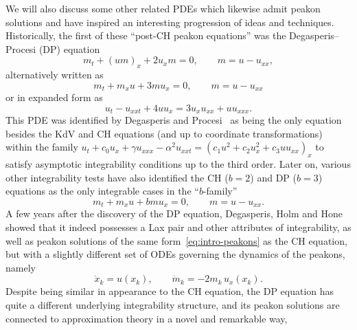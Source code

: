 \documentclass[10pt,a4paper]{article} \pdfoutput=1 
\begin{document}
We will also discuss some other related PDEs which likewise admit peakon solutions
and have inspired an interesting progression of ideas and techniques.
Historically, the first of these ``post-CH peakon equations''
was the Degasperis--Procesi (DP) equation
\begin{equation}
  \label{eq:intro-DP}
  m_t + (u m)_x + 2 u_x m = 0
  ,\qquad
  m = u - u_{xx}
  ,
\end{equation}
alternatively written as
\begin{equation}
  \label{eq:intro-DP-b-form}
  m_t + m_x u + 3 m u_x = 0
  ,\qquad
  m = u - u_{xx}
\end{equation}
or in expanded form as
\begin{equation}
  \label{eq:intro-DP-expanded}
  u_t - u_{xxt} + 4 u u_x = 3  u_x u_{xx} + u u_{xxx}
  .
\end{equation}
This PDE was identified by Degasperis and Procesi~\cite{degasperis-procesi:1999:asymptotic-integrability}
as being the only equation besides the KdV and CH equations
(and up to coordinate transformations) within the family
$u_t + c_0 u_x + \gamma u_{xxx} - \alpha^2 u_{xxt} = (c_1 u^2 + c_2 u_x^2 + c_3 u u_{xx})_x$
to satisfy asymptotic integrability conditions up to the third order.
Later on, various other integrability tests
\cite{mikhailov-novikov:2002:perturbative,
  hone-wang:2003:prolongation-algebras,
  ivanov:2005:integrability-class-nonlinear-dispersive-wave-equations}
have also identified the CH ($b=2$)
and DP ($b=3$) equations as the only integrable cases in the ``$b$-family''
\begin{equation}
  \label{eq:intro-b-family}
  m_t + m_x u + b m u_x = 0
  ,\qquad
  m = u - u_{xx}
  .
\end{equation}
A few years after the discovery of the DP equation,
Degasperis, Holm and Hone~\cite{degasperis-holm-hone:2002:new-integrable-equation-DP}
showed that it indeed possesses a Lax pair and other attributes of integrability,
as well as peakon solutions of the same form~\eqref{eq:intro-peakons} as the CH equation,
but with a slightly different set of ODEs governing the dynamics of the peakons, namely
\begin{equation}
  \label{eq:intro-DP-peakon-ode}
  \dot x_k = u(x_k)
  ,\qquad
  \dot m_k = -2 m_k \, u_x(x_k)
  .
\end{equation}
Despite being similar in appearance to the CH equation,
the DP equation has quite a different underlying integrability structure,
and its peakon solutions are connected to
approximation theory in a novel and remarkable way,
\end{document}
